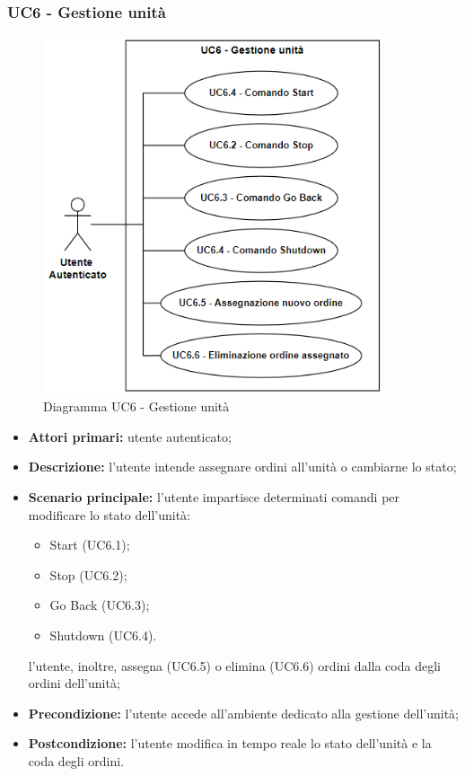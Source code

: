     \subsubsection{UC6 - Gestione unità}
    \begin{figure}[h!]
        \centering
        \includegraphics[width=10cm]{images/uc6.png}
        \caption{Diagramma UC6 - Gestione unità}
    \end{figure}
    \begin{itemize}
        \item \textbf{Attori primari:} utente autenticato;
        \item \textbf{Descrizione:} l'utente intende assegnare ordini all'unità o cambiarne lo stato;
        \item \textbf{Scenario principale:} l'utente impartisce determinati comandi per modificare lo stato dell'unità:
        \begin{itemize}
            \item Start (UC6.1);
            \item Stop (UC6.2);
            \item Go Back (UC6.3);
            \item Shutdown (UC6.4).
        \end{itemize}
        l'utente, inoltre, assegna (UC6.5) o elimina (UC6.6) ordini dalla coda degli ordini dell'unità;
        \item \textbf{Precondizione:} l'utente accede all'ambiente dedicato alla gestione dell'unità;
        \item \textbf{Postcondizione:} l'utente modifica in tempo reale lo stato dell'unità e la coda degli ordini.
    \end{itemize}


